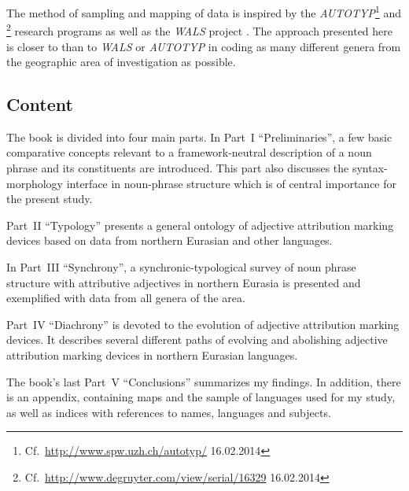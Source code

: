 The method of sampling and mapping of data is inspired by the \emph{AUTOTYP}\footnote{Cf.~\url{http://www.spw.uzh.ch/autotyp/} 16.02.2014} and \emph{}\footnote{Cf.~\url{http://www.degruyter.com/view/serial/16329} 16.02.2014} research programs as well as the \emph{WALS} project \citep{walsOnline2013}. The approach presented here is closer to \emph{} than to \emph{WALS} or \emph{AUTOTYP} in coding as many different genera from the geographic area of investigation as possible.

\subsection*{Content}
The book is divided into four main parts. In Part~I “Preliminaries”, a few basic comparative concepts relevant to a framework-neutral description of a noun phrase and its constituents are introduced. This part also discusses the syntax-morphology interface in noun-phrase structure which is of central importance for the present study.

Part~II “Typology” presents a general ontology of adjective attribution marking devices based on data from northern Eurasian and other languages.

In Part~III “Synchrony”, a synchronic-typological survey of noun phrase structure with attributive adjectives in northern Eurasia is presented and exemplified with data from all genera of the area.

Part~IV “Diachrony” is devoted to the evolution of adjective attribution marking devices. It describes several different paths of evolving and abolishing adjective attribution marking devices in northern Eurasian languages.

The book's last Part~V “Conclusions” summarizes my findings. In addition, there is an appendix, containing maps and the sample of languages used for my study, as well as indices with references to names, languages and subjects.
